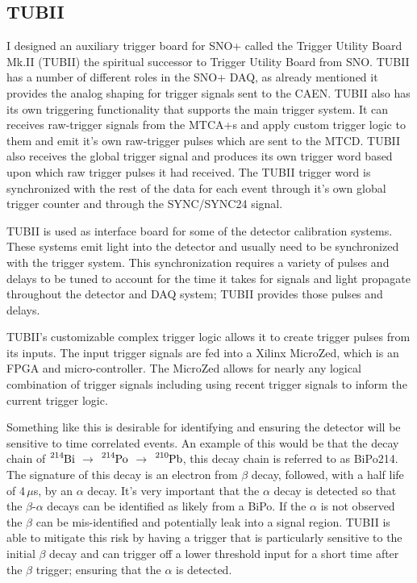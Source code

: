 \subsection{TUBII}
\label{sec:tubii}
I designed an auxiliary trigger board for SNO+ called the Trigger
Utility Board Mk.II (TUBII) the spiritual successor to Trigger Utility Board
from SNO\@. 
TUBII has a number of different roles in the SNO+ DAQ, as already mentioned it
provides the analog shaping for trigger signals sent to the CAEN\@.
TUBII also has its own triggering functionality that supports the main
trigger system. It can receives raw-trigger signals from the MTCA+s and
apply custom trigger logic to them and emit it's own raw-trigger pulses which are
sent to the MTCD\@.
TUBII also receives the global trigger signal and produces its own trigger
word based upon which raw trigger pulses it had received. The TUBII trigger
word is synchronized with the rest of the data for each event through it's own
global trigger counter and through the SYNC/SYNC24 signal.

TUBII is used as interface board for some of the detector calibration systems.
These systems emit light into the detector and usually need to be
synchronized with the trigger system. This synchronization requires
a variety of pulses and delays to be tuned to account for the time it
takes for signals and light propagate throughout the detector and DAQ
system; TUBII provides those pulses and delays.

TUBII's customizable complex trigger logic
allows it to create trigger pulses from its inputs.
The input trigger signals are fed into a Xilinx MicroZed, which is an FPGA and
micro-controller.
The MicroZed allows for nearly any logical combination of trigger signals including
using recent trigger signals to inform the current trigger logic.

Something like this is desirable for identifying and ensuring the detector will
be sensitive to time correlated events. An example of this would be that
the decay chain of $\ce{^{214}Bi}$ $\rightarrow$ $\ce{^{214}Po}$ $\rightarrow$ $\ce{^{210}Pb}$,
this decay chain is referred to as BiPo214. %
The signature of this decay is an electron from $\beta$ decay, followed, with a half
life of 4\,$\mu$s, by an $\alpha$ decay.
It's very important that the $\alpha$ decay is detected so that the $\beta$-$\alpha$
decays can be identified as likely from a BiPo. If the $\alpha$ is not observed
the $\beta$ can be mis-identified and potentially leak into a signal region.
TUBII is able to mitigate this risk by having a trigger that is particularly
sensitive to the initial $\beta$ decay and can trigger off a lower
threshold input for a short time after the $\beta$ trigger; ensuring that
the $\alpha$ is detected.

